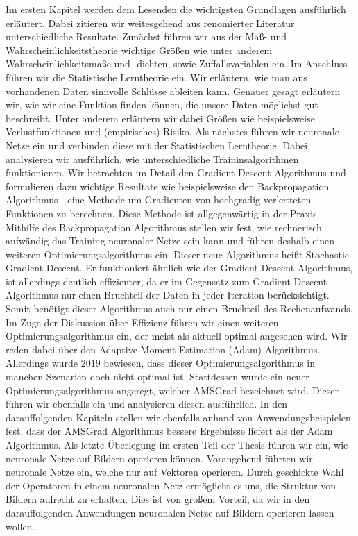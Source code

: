 \documentclass[11pt, twoside, a4paper]{book}
\theoremstyle{plain}
\theoremstyle{definition}
\theoremstyle{plain}
\begin{document}
Im ersten Kapitel werden dem Lesenden die wichtigsten Grundlagen ausführlich erläutert. Dabei zitieren wir weitesgehend aus renomierter Literatur unterschiedliche Resultate. Zunächst führen wir aus der Maß- und Wahrscheinlichkeitstheorie wichtige Größen wie unter anderem Wahrscheinlichkeitsmaße und -dichten, sowie Zuffallsvariablen ein.
Im Anschluss führen wir die Statistische Lerntheorie ein. Wir erläutern, wie man aus vorhandenen Daten sinnvolle Schlüsse ableiten kann. Genauer gesagt erläutern wir, wie wir eine Funktion finden können, die unsere Daten möglichst gut beschreibt. Unter anderem erläutern wir dabei Größen wie beispielsweise Verlustfunktionen und (empirisches) Risiko.
Als nächstes führen wir neuronale Netze ein und verbinden diese mit der Statistischen Lerntheorie. Dabei analysieren wir ausführlich, wie unterschiedliche Traininsalgorithmen funktionieren. Wir betrachten im Detail den \glqq Gradient Descent\grqq{} Algorithmus und formulieren dazu wichtige Resultate wie beispielsweise den \glqq Backpropagation\grqq{} Algorithmus - eine Methode um Gradienten von hochgradig verketteten Funktionen zu berechnen. Diese Methode ist allgegenwärtig in der Praxis.
Mithilfe des Backpropagation Algorithmus stellen wir fest, wie rechnerisch aufwändig das Training neuronaler Netze sein kann und führen deshalb einen weiteren Optimierungsalgorithmus ein. Dieser neue Algorithmus heißt \glqq Stochastic Gradient Descent\grqq{}. Er funktioniert ähnlich wie der Gradient Descent Algorithmus, ist allerdings deutlich effizienter, da er im Gegensatz zum Gradient Descent Algorithmus nur einen Bruchteil der Daten in jeder Iteration berücksichtigt. Somit benötigt dieser Algorithmus auch nur einen Bruchteil des Rechenaufwands.
Im Zuge der Diskussion über Effizienz führen wir einen weiteren Optimierungsalgorithmus ein, der meist als aktuell optimal angesehen wird. Wir reden dabei über den \glqq Adaptive Moment Estimation\grqq{} (Adam) Algorithmus. Allerdings wurde $2019$ bewiesen, dass dieser Optimierungsalgorithmus in manchen Szenarien doch nicht optimal ist. Stattdessen wurde ein neuer Optimierungsalgorithmus angeregt, welcher \glqq AMSGrad\grqq{} bezeichnet wird. Diesen führen wir ebenfalls ein und analysieren diesen ausführlich. In den darauffolgenden Kapiteln stellen wir ebenfalls anhand von Anwendungsbeispielen fest, dass der AMSGrad Algorithmus bessere Ergebnisse liefert als der Adam Algorithmus.
Als letzte Überlegung im ersten Teil der Thesis führen wir ein, wie neuronale Netze auf Bildern operieren können. Vorangehend führten wir neuronale Netze ein, welche nur auf Vektoren operieren. Durch geschickte Wahl der Operatoren in einem neuronalen Netz ermöglicht es uns, die Struktur von Bildern aufrecht zu erhalten. Dies ist von großem Vorteil, da wir in den darauffolgenden Anwendungen neuronalen Netze auf Bildern operieren lassen wollen.
\end{document}
